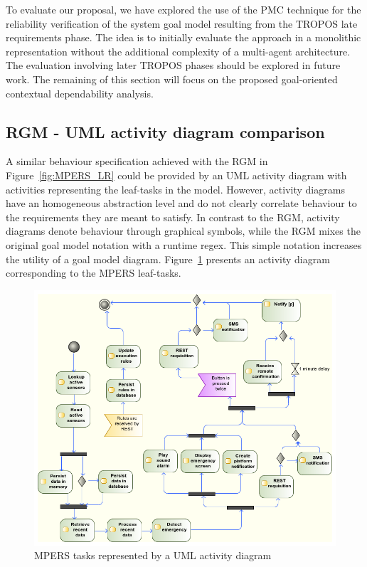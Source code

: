 To evaluate our proposal, we have explored the use of the PMC technique for the reliability verification of the system goal model resulting from the TROPOS late requirements phase. The idea is to initially evaluate the approach in a monolithic representation without the additional complexity of a multi-agent architecture. The evaluation involving later TROPOS phases should be explored in future work. The remaining of this section will focus on the proposed goal-oriented contextual dependability analysis.

\subsection{RGM - UML activity diagram comparison}\label{ssec:RGM-UML}

A similar behaviour specification achieved with the RGM in Figure~\ref{fig:MPERS_LR} could be provided by an UML activity diagram with activities representing the leaf-tasks in the model. However, activity diagrams have an homogeneous abstraction level and do not clearly correlate behaviour to the requirements they are meant to satisfy. In contrast to the RGM, activity diagrams denote behaviour through graphical symbols, while the RGM mixes the original goal model notation with a runtime regex. This simple notation increases the utility of a goal model diagram. Figure~\ref{fig:MPERS_UMLAD} presents an activity diagram corresponding to the MPERS leaf-tasks. 

\begin{figure}[h!]
\centering
\includegraphics[width=1\textwidth]{imgs/MPERS_UMLAD.png}
\caption{MPERS tasks represented by a UML activity diagram}
\label{fig:MPERS_UMLAD}
\end{figure}

